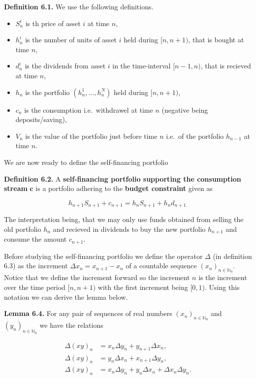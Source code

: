 \documentclass[
]{article}
\providecommand{\tightlist}{%
  \setlength{\itemsep}{0pt}\setlength{\parskip}{0pt}}
\begin{document}
\textbf{Definition 6.1.} We use the following definitions.

\begin{itemize}
\tightlist
\item
  \(S_n^i\) is th price of asset \(i\) at time \(n\),
\item
  \(h_n^i\) is the number of units of asset \(i\) held during
  \([n,n+1)\), that is bought at time \(n\),
\item
  \(d_n^i\) is the dividends from asset \(i\) in the time-interval
  \([n-1,n)\), that is recieved at time \(n\),
\item
  \(h_n\) is the portfolio \((h_n^1,...,h_n^N)\) held during
  \([n,n+1)\),
\item
  \(c_n\) is the consumption i.e.~withdrawel at time \(n\) (negative
  being deposits/saving),
\item
  \(V_n\) is the value of the portfolio just before time \(n\) i.e.~of
  the portfolio \(h_{n-1}\) at time \(n\).
\end{itemize}

We are now ready to define the self-financing portfolio

\textbf{Definition 6.2.} A \textbf{self-financing portfolio supporting
the consumption stream} \(\mathbf{c}\) is a portfolio adhering to the
\textbf{budget constraint} given as

\[
h_{n+1}S_{n+1}+c_{n+1}=h_nS_{n+1}+h_nd_{n+1.}
\]

The interpretation being, that we may only use funds obtained from
selling the old portfolio \(h_n\) and recieved in dividends to buy the
new portfolio \(h_{n+1}\) and consume the amount \(c_{n+1}\).

Before studying the self-financing portfolio we define the operator
\(\Delta\) (in definition 6.3) as the increment
\(\Delta x_n=x_{n+1}-x_n\) of a countable sequence
\((x_n)_{n\in\mathbb{N}_0}\). Notice that we define the increment
forward so the increment \(n\) is the increment over the time period
\([n,n+1)\) with the first increment being \([0,1)\). Using this
notation we can derive the lemma below.

\textbf{Lemma 6.4.} For any pair of sequences of real numbers
\((x_n)_{n\in\mathbb{N}_0}\) and \((y_n)_{n\in\mathbb{N}_0}\) we have
the relations

\begin{align*}
\Delta(xy)_n&=x_n\Delta y_n+y_{n+1}\Delta x_n,\\
\Delta(xy)_n&=y_n\Delta x_n+x_{n+1}\Delta y_n,\\
\Delta(xy)_n&=x_n\Delta y_n+y_n\Delta x_n+\Delta x_n\Delta y_n.
\end{align*}
\end{document}
